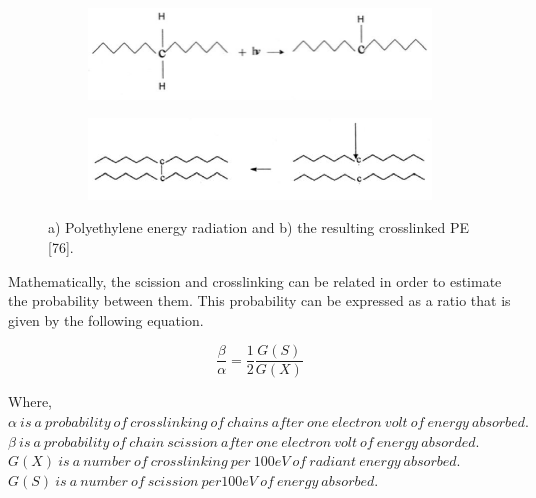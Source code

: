 \documentclass[12pt]{report}
\begin{document}
\begin{figure}[H]
\captionsetup[subfigure]{justification=raggedright}

\centering

\begin{subfigure}{.9\textwidth}
    \centering
    \includegraphics[width=\textwidth]{polyethylene_energy_radiation.jpg}
    \caption{}
\end{subfigure}
\begin{subfigure}{.9\textwidth}
    \centering
    \includegraphics[width=\textwidth]{resulting_crosslinked_pe.jpg}
    \caption{}
\end{subfigure}

\caption{a) Polyethylene energy radiation and b) the resulting crosslinked PE [76].}
\label{ch3:figure:radiation}
\end{figure}

Mathematically, the scission and crosslinking can be related in order to estimate the probability between them. This probability can be expressed as a ratio that is given by the following equation.

\begin{equation}
    \frac{\beta}{\alpha}=\frac{1}{2}\frac{G(S)}{G(X)}
\end{equation}

\noindent Where, \\
$\alpha\ is\ a\ probability\ of\ crosslinking\ of\ chains\ after\ one\ electron\ volt\ of\ energy\ absorbed.$ \\
$\beta\ is\ a\ probability\ of\ chain\ scission\ after\ one\ electron\ volt\ of\ energy\ absorded.$ \\
$G(X)\ is\ a\ number\ of\ crosslinking\ per\ 100eV\ of\ radiant\ energy\ absorbed.$ \\
$G(S)\ is\ a\ number\ of\ scission\ per 100eV\ of\ energy\ absorbed.$ \\
\end{document}
